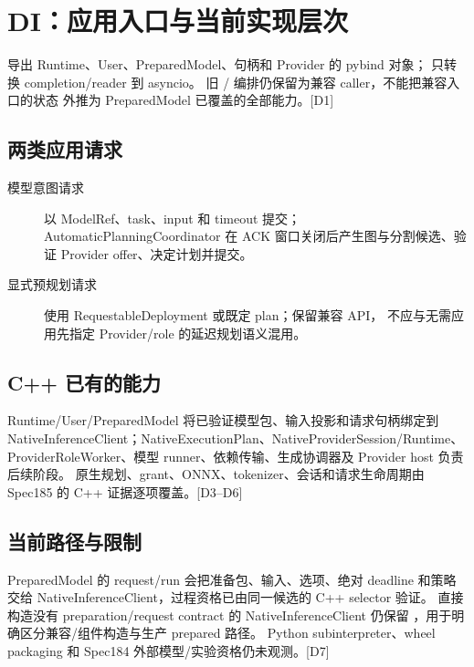 \newpage

\section{DI：应用入口与当前实现层次}
 导出 Runtime、User、PreparedModel、句柄和
Provider 的 pybind 对象； 只转换 completion/reader 到 asyncio。
旧 / 编排仍保留为兼容 caller，不能把兼容入口的状态
外推为 PreparedModel 已覆盖的全部能力。[D1]

\subsection{两类应用请求}
\begin{description}
\item[模型意图请求] 以 ModelRef、task、input 和 timeout 提交；AutomaticPlanningCoordinator
在 ACK 窗口关闭后产生图与分割候选、验证 Provider offer、决定计划并提交。
\item[显式预规划请求] 使用 RequestableDeployment 或既定 plan；保留兼容 API，
不应与无需应用先指定 Provider/role 的延迟规划语义混用。
\end{description}

\subsection{C++ 已有的能力}
Runtime/User/PreparedModel 将已验证模型包、输入投影和请求句柄绑定到
NativeInferenceClient；NativeExecutionPlan、NativeProviderSession/Runtime、
ProviderRoleWorker、模型 runner、依赖传输、生成协调器及 Provider host 负责后续阶段。
原生规划、grant、ONNX、tokenizer、会话和请求生命周期由 Spec185 的 C++ 证据逐项覆盖。[D3--D6]

\subsection{当前路径与限制}
PreparedModel 的 request/run 会把准备包、输入、选项、绝对 deadline 和策略交给
NativeInferenceClient，过程资格已由同一候选的 C++ selector 验证。
直接构造没有 preparation/request contract 的 NativeInferenceClient 仍保留
，用于明确区分兼容/组件构造与生产 prepared 路径。
Python subinterpreter、wheel packaging 和 Spec184 外部模型/实验资格仍未观测。[D7]



